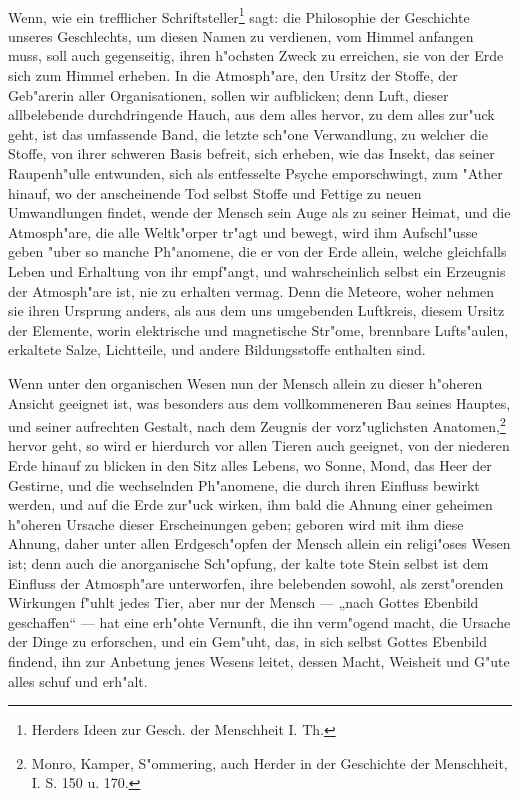 \documentclass[a4paper, 11pt, oneside, polutonikogreek, german]{article}
\begin{document}
\paragraph{}
Wenn, wie ein trefflicher Schriftsteller\footnote{Herders Ideen zur Gesch. der Menschheit I. Th.} sagt: die Philosophie der Geschichte unseres Geschlechts, um diesen Namen zu verdienen, vom Himmel anfangen muss, soll auch gegenseitig, ihren h"ochsten Zweck zu erreichen, sie von der Erde sich zum Himmel erheben. In die Atmosph"are, den Ursitz der Stoffe, der Geb"arerin aller Organisationen, sollen wir aufblicken; denn Luft, dieser allbelebende durchdringende Hauch, aus dem alles hervor, zu dem alles zur"uck geht, ist das umfassende Band, die letzte sch"one Verwandlung, zu welcher die Stoffe, von ihrer schweren Basis befreit, sich erheben, wie das Insekt, das seiner Raupenh"ulle entwunden, sich als entfesselte Psyche emporschwingt, zum "Ather hinauf, wo der anscheinende Tod selbst Stoffe und Fettige zu neuen Umwandlungen findet, wende der Mensch sein Auge als zu seiner Heimat, und die Atmosph"are, die alle Weltk"orper tr"agt und bewegt, wird ihm Aufschl"usse geben "uber so manche Ph"anomene, die er von der Erde allein, welche gleichfalls Leben und Erhaltung von ihr empf"angt, und wahrscheinlich selbst ein Erzeugnis der Atmosph"are ist, nie zu erhalten vermag. Denn die Meteore, woher nehmen sie ihren Ursprung anders, als aus dem uns umgebenden Luftkreis, diesem Ursitz der Elemente, worin elektrische und magnetische Str"ome, brennbare Lufts"aulen, erkaltete Salze, Lichtteile, und andere Bildungsstoffe enthalten sind.

Wenn unter den organischen Wesen nun der Mensch allein zu dieser h"oheren Ansicht geeignet ist, was besonders aus dem vollkommeneren Bau seines Hauptes, und seiner aufrechten Gestalt, nach dem Zeugnis der vorz"uglichsten Anatomen,\footnote{Monro, Kamper, S"ommering, auch Herder in der Geschichte der Menschheit, I. S. 150 u. 170.} hervor geht, so wird er hierdurch vor allen Tieren auch geeignet, von der niederen Erde hinauf zu blicken in den Sitz alles Lebens, wo Sonne, Mond, das Heer der Gestirne, und die wechselnden Ph"anomene, die durch ihren Einfluss bewirkt werden, und auf die Erde zur"uck wirken, ihm bald die Ahnung einer geheimen h"oheren Ursache dieser Erscheinungen geben; geboren wird mit ihm diese Ahnung, daher unter allen Erdgesch"opfen der Mensch allein ein religi"oses Wesen ist; denn auch die anorganische Sch"opfung, der kalte tote Stein selbst ist dem Einfluss der Atmosph"are unterworfen, ihre belebenden sowohl, als zerst"orenden Wirkungen f"uhlt jedes Tier, aber nur der Mensch --- „nach Gottes Ebenbild geschaffen“ --- hat eine erh"ohte Vernunft, die ihn verm"ogend macht, die Ursache der Dinge zu erforschen, und ein Gem"uht, das, in sich selbst Gottes Ebenbild findend, ihn zur Anbetung jenes Wesens leitet, dessen Macht, Weisheit und G"ute alles schuf und erh"alt.
\end{document}
